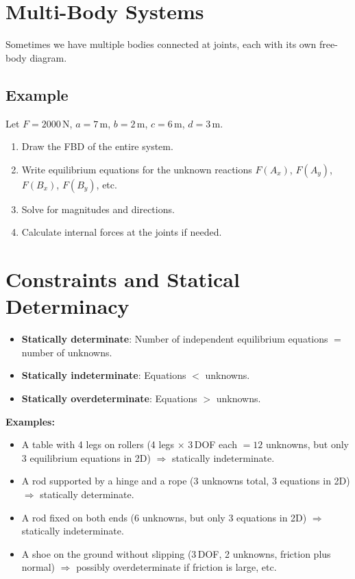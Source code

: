 \documentclass{article}
\begin{document}
\section{Multi-Body Systems}
Sometimes we have multiple bodies connected at joints, each with its own free-body diagram.

\subsection*{Example}
Let $F = 2000\,\mathrm{N}$, $a = 7\,\mathrm{m}$, $b = 2\,\mathrm{m}$, $c = 6\,\mathrm{m}$, $d = 3\,\mathrm{m}$.  

\begin{enumerate}
\item Draw the FBD of the entire system.  
\item Write equilibrium equations for the unknown reactions $F(A_x)$, $F(A_y)$, $F(B_x)$, $F(B_y)$, etc.  
\item Solve for magnitudes and directions.  
\item Calculate internal forces at the joints if needed.
\end{enumerate}

\section{Constraints and Statical Determinacy}
\begin{itemize}
\item \textbf{Statically determinate}: Number of independent equilibrium equations $=$ number of unknowns.  
\item \textbf{Statically indeterminate}: Equations $<$ unknowns.  
\item \textbf{Statically overdeterminate}: Equations $>$ unknowns.
\end{itemize}

\textbf{Examples:}
\begin{itemize}
\item A table with 4 legs on rollers (4 legs $\times$ 3\,DOF each $=12$ unknowns, but only 3 equilibrium equations in 2D) $\Rightarrow$ statically indeterminate.
\item A rod supported by a hinge and a rope (3 unknowns total, 3 equations in 2D) $\Rightarrow$ statically determinate.
\item A rod fixed on both ends (6 unknowns, but only 3 equations in 2D) $\Rightarrow$ statically indeterminate.
\item A shoe on the ground without slipping (3\,DOF, 2 unknowns, friction plus normal) $\Rightarrow$ possibly overdeterminate if friction is large, etc.
\end{itemize}
\end{document}
